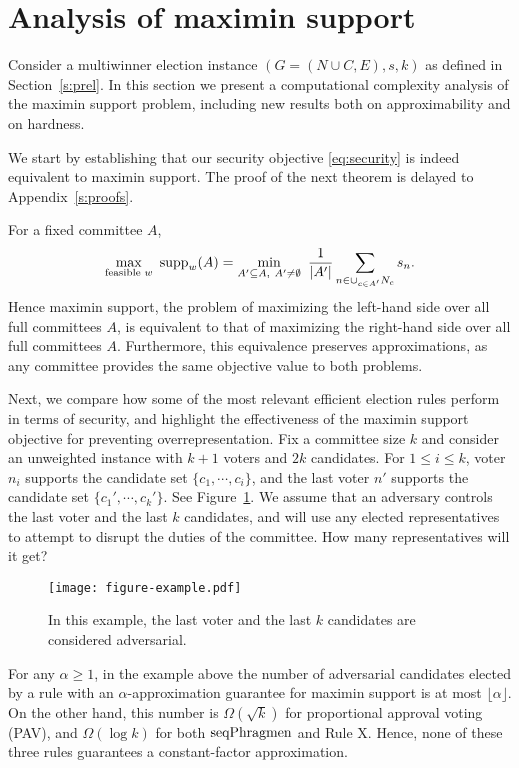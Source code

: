 \section{Analysis of maximin support}\label{s:complexity}

Consider a multiwinner election instance $(G=(N\cup C, E), s, k)$ as defined in Section~\ref{s:prel}. 
In this section we present a computational complexity analysis of the maximin support problem, including new results both on approximability and on hardness. 

We start by establishing that our security objective \eqref{eq:security} is indeed equivalent to maximin support.
The proof of the next theorem is delayed to Appendix~\ref{s:proofs}.

\begin{theorem} \label{thm:equivalence} 
For a fixed committee $A$, 
$$\max_{\text{feasible } w} \ \operatorname{supp}_w(A) = \min_{A' \subseteq A, \ A'\neq \emptyset} \ \frac{1}{|A'|} \sum_{n\in \cup_{c\in A'} N_c} s_n.$$
Hence maximin support, the problem of maximizing the left-hand side over all full committees $A$,  
is equivalent to that of maximizing the right-hand side over all full committees $A$. 
Furthermore, this equivalence preserves approximations, as any committee provides the same objective value to both problems.
\end{theorem}

Next, we compare how some of the most relevant efficient election rules perform in terms of security, and highlight the effectiveness of the maximin support objective for preventing overrepresentation. 
Fix a committee size $k$ and consider an unweighted instance with $k+1$ voters and $2k$ candidates. 
For $1\leq i\leq k$, voter $n_i$ supports the candidate set $\{c_1, \cdots, c_i\}$, and the last voter $n'$ supports the candidate set $\{c_1', \cdots, c_k'\}$. See Figure~\ref{fig:example}.
%
We assume that an adversary controls the last voter and the last $k$ candidates, and will use any elected representatives to attempt to disrupt the duties of the committee. 
How many representatives will it get? 

\begin{figure}[htb]
  \centering
	\texttt{[image: figure-example.pdf]}
  \caption{In this example, the last voter and the last $k$ candidates are considered adversarial.}
  \label{fig:example}
\end{figure}

\begin{lemma}\label{lem:badexamples}
For any $\alpha \geq 1$, in the example above the number of adversarial candidates elected by a rule with an $\alpha$-approximation guarantee for maximin support is at most $\lfloor \alpha \rfloor$. 
On the other hand, this number is $\Omega(\sqrt{k})$ for proportional approval voting (PAV), and $\Omega(\log k)$ for both $\operatorname{seqPhragmen}$ and Rule X. 
Hence, none of these three rules guarantees a constant-factor approximation. 
\end{lemma}

